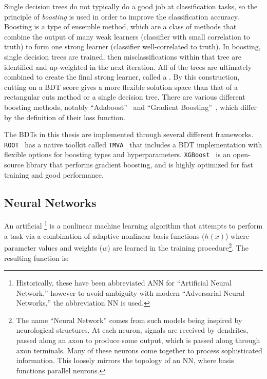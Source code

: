 Single decision trees do not typically do a good job at classification tasks, so the principle of \textit{boosting} is used in order to improve the classification accuracy. Boosting is a type of ensemble method, which are a class of methods that combine the output of many weak learners (classifier with small correlation to truth) to form one strong learner (classifier well-correlated to truth). In boosting, single decision trees are trained, then misclassifications within that tree are identified and up-weighted in the next iteration. All of the trees are ultimately combined to create the final strong learner, called a . By this construction, cutting on a \gls{BDT} score gives a more flexible solution space than that of a rectangular cuts method or a single decision tree. There are various different boosting methods, notably ``Adaboost''~\cite{adaboost} and ``Gradient Boosting''~\cite{gradBoost}, which differ by the definition of their loss function.

The \glspl{BDT} in this thesis are implemented through several different frameworks. \texttt{ROOT}~\cite{ROOT} has a native toolkit called \texttt{TMVA}~\cite{TMVA} that includes a \gls{BDT} implementation with flexible options for boosting types and hyperparameters. \texttt{XGBoost}~\cite{XGBoost} is an open-source library that performs gradient boosting, and is highly optimized for fast training and good performance.


\subsection{Neural Networks}\label{ssec:nn}

An artificial \footnote{Historically, these have been abbreviated ANN for ``Artificial Neural Network,'' however to avoid ambiguity with modern ``Adversarial Neural Networks,'' the abbreviation NN is used.} is a nonlinear machine learning algorithm that attempts to perform a task via a combination of adaptive nonlinear basis functions ($h(x)$) where parameter values and weights ($w$) are learned in the training procedure\footnote{The name ``Neural Network'' comes from such models being inspired by neurological structures. At each neuron, signals are received by dendrites, passed along an axon to produce some output, which is passed along through axon terminals. Many of these neurons come together to process sophisticated information. This loosely mirrors the topology of an \gls{NN}, where basis functions parallel neurons.}. The resulting function is:

